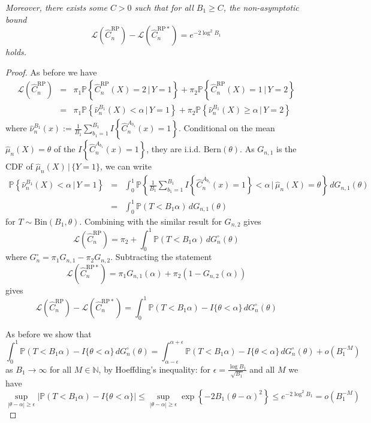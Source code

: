 \documentclass[ejs,preprint]{imsart}
\newcommand\crpnhat{\hat{C}_{n}^{\mathrm{RP}}}
\newcommand\crpnhatstar{\hat{C}_{n}^{\mathrm{RP*}}}
\newcommand\risk{\mathcal{L}}
\begin{document}
\emph{Moreover, there exists some $C>0$ such that for all $B_1\geq C$, the non-asymptotic bound
\[
\risk\left(\crpnhat\right)-\risk\left(\crpnhatstar\right)=e^{-2\log^2 B_1}
\]
holds.}


\begin{proof}
As before we have 
\begin{eqnarray*}
\risk(\crpnhat) & = & \pi_{1}\mathbb{P}\left\{ \crpnhat(X)=2\,|\,Y=1\right\} +\pi_{2}\mathbb{P}\left\{ \crpnhat(X)=1\,|\,Y=2\right\} \\
 & = & \pi_{1}\mathbb{P}\left\{ \hat{\nu}_{n}^{B_{1}}(X)<\alpha\,|\,Y=1\right\} +\pi_{2}\mathbb{P}\left\{ \hat{\nu}_{n}^{B_{1}}(X)\geq\alpha\,|\,Y=2\right\} 
\end{eqnarray*}
 where $\hat{\nu}_{n}^{B_{1}}(x):=\frac{1}{B_{1}}\sum_{b_{1}=1}^{B_{1}}I\left\{ \hat{C}_{n}^{A_{b_{1}}}(x)=1\right\} $.
Conditional on the mean $\hat{\mu}_{n}(X)=\theta$ of the $I\left\{ \hat{C}_{n}^{A_{b_{1}}}(x)=1\right\} $,
they are i.i.d. $\mathrm{Bern}(\theta)$. As $G_{n,1}$ is the CDF
of $\hat{\mu}_{n}(X)\,|\,\{Y=1\}$, we can write 
\begin{eqnarray*}
\mathbb{P}\left\{ \hat{\nu}_{n}^{B_{1}}(X)<\alpha\,|\,Y=1\right\}  & = & \int_{0}^{1}\!\mathbb{P}\left\{ \frac{1}{B_{1}}\sum_{b_{1}=1}^{B_{1}}I\left\{ \hat{C}_{n}^{A_{b_{1}}}(x)=1\right\} <\alpha\,\bigg|\,\hat{\mu}_{n}(X)=\theta\right\} \,dG_{n,1}(\theta)\\
 & = & \int_{0}^{1}\!\mathbb{P}(T<B_{1}\alpha)\,dG_{n,1}(\theta)
\end{eqnarray*}
 for $T\sim\mathrm{Bin}(B_{1},\theta)$. Combining with the similar
result for $G_{n,2}$ gives 
\[
\risk(\crpnhat)=\pi_{2}+\int_{0}^{1}\!\mathbb{P}(T<B_{1}\alpha)\,dG_{n}^{\circ}(\theta)
\]
 where $G_{n}^{\circ}=\pi_{1}G_{n,1}-\pi_{2}G_{n,2}$. Subtracting the statement 
\[
\risk\left(\crpnhatstar\right)=\pi_{1}G_{n,1}(\alpha)+\pi_{2}\left(1-G_{n,2}(\alpha)\right)
\]
 gives 
\[
\risk\left(\crpnhat\right)-\risk\left(\crpnhatstar\right)=\int_{0}^{1}\!\mathbb{P}(T<B_{1}\alpha)-I\{\theta<\alpha\}\,dG_{n}^{\circ}(\theta)
\]


As before we show that 
\[
\int_{0}^{1}\!\mathbb{P}(T<B_{1}\alpha)-I\{\theta<\alpha\}\,dG_{n}^{\circ}(\theta)=\int_{\alpha-\epsilon}^{\alpha+\epsilon}\!\mathbb{P}(T<B_{1}\alpha)-I\{\theta<\alpha\}\,dG_{n}^{\circ}(\theta)+o(B_{1}^{-M})
\]
 as $B_{1}\to\infty$ for all $M\in\mathbb{N}$, by Hoeffding's inequality:
for $\epsilon=\frac{\log B_{1}}{\sqrt{B_{1}}}$ and all $M$ we have
\[
\sup_{|\theta-\alpha|\geq\epsilon}\left|\mathbb{P}(T<B_{1}\alpha)-I\{\theta<\alpha\}\right|\leq\sup_{|\theta-\alpha|\geq\epsilon}\exp\left\{ -2B_{1}(\theta-\alpha)^{2}\right\} \leq e^{-2\log^{2}B_{1}}=o(B_{1}^{-M})
\]



\end{proof}
\end{document}
